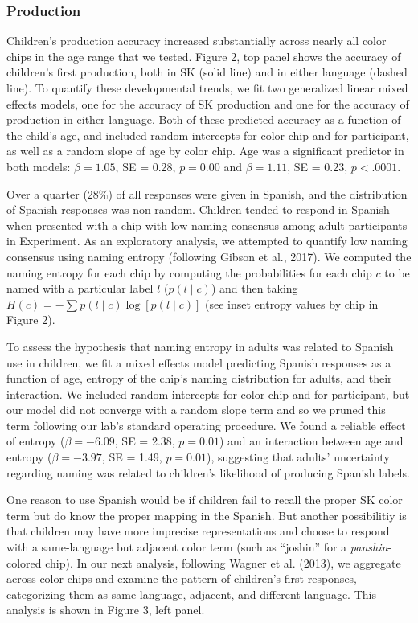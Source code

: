 \documentclass[
  english,
  ,man,floatsintext]{apa6}
\begin{document}
\hypertarget{production}{%
\subsubsection{Production}\label{production}}

Children's production accuracy increased substantially across nearly all color chips in the age range that we tested. Figure 2, top panel shows the accuracy of children's first production, both in SK (solid line) and in either language (dashed line). To quantify these developmental trends, we fit two generalized linear mixed effects models, one for the accuracy of SK production and one for the accuracy of production in either language. Both of these predicted accuracy as a function of the child's age, and included random intercepts for color chip and for participant, as well as a random slope of age by color chip. Age was a significant predictor in both models: \(\beta = 1.05\), SE = 0.28, \(p = 0.00\) and \(\beta = 1.11\), SE = 0.23, \(p < .0001\).

Over a quarter (28\%) of all responses were given in Spanish, and the distribution of Spanish responses was non-random. Children tended to respond in Spanish when presented with a chip with low naming consensus among adult participants in Experiment. As an exploratory analysis, we attempted to quantify low naming consensus using naming entropy (following Gibson et al., 2017). We computed the naming entropy for each chip by computing the probabilities for each chip \(c\) to be named with a particular label \(l\) (\(p(l \mid c)\)) and then taking \(H(c) = - \sum{p(l\mid c) \log[p(l \mid c)]}\) (see inset entropy values by chip in Figure 2).

To assess the hypothesis that naming entropy in adults was related to Spanish use in children, we fit a mixed effects model predicting Spanish responses as a function of age, entropy of the chip's naming distribution for adults, and their interaction. We included random intercepts for color chip and for participant, but our model did not converge with a random slope term and so we pruned this term following our lab's standard operating procedure. We found a reliable effect of entropy (\(\beta = -6.09\), SE = 2.38, \(p = 0.01\)) and an interaction between age and entropy (\(\beta = -3.97\), SE = 1.49, \(p = 0.01\)), suggesting that adults' uncertainty regarding naming was related to children's likelihood of producing Spanish labels.

One reason to use Spanish would be if children fail to recall the proper SK color term but do know the proper mapping in the Spanish. But another possibilitiy is that children may have more imprecise representations and choose to respond with a same-language but adjacent color term (such as \enquote{joshin} for a \emph{panshin}-colored chip). In our next analysis, following Wagner et al. (2013), we aggregate across color chips and examine the pattern of children's first responses, categorizing them as same-language, adjacent, and different-language. This analysis is shown in Figure 3, left panel.
\end{document}
